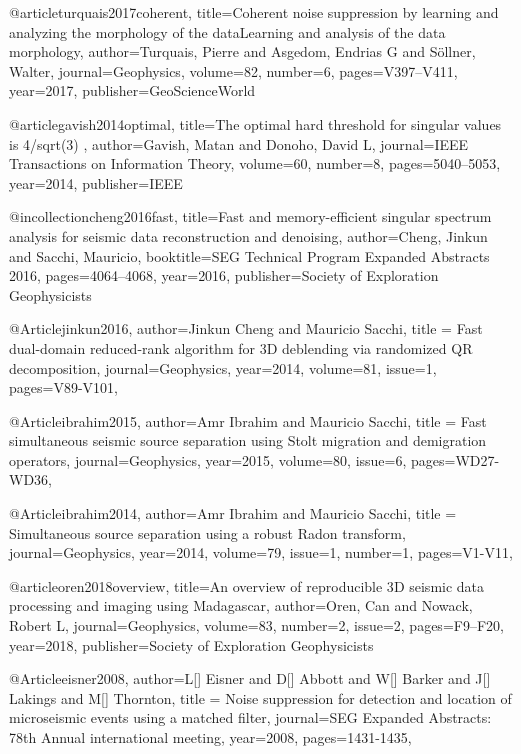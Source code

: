 @article{turquais2017coherent,
  title={Coherent noise suppression by learning and analyzing the morphology of the dataLearning and analysis of the data morphology},
  author={Turquais, Pierre and Asgedom, Endrias G and S{\"o}llner, Walter},
  journal={Geophysics},
  volume={82},
  number={6},
  pages={V397--V411},
  year={2017},
  publisher={GeoScienceWorld}
}

@article{gavish2014optimal,
  title={The optimal hard threshold for singular values is 4/sqrt(3) },
  author={Gavish, Matan and Donoho, David L},
  journal={IEEE Transactions on Information Theory},
  volume={60},
  number={8},
  pages={5040--5053},
  year={2014},
  publisher={IEEE}
}

@incollection{cheng2016fast,
  title={Fast and memory-efficient singular spectrum analysis for seismic data reconstruction and denoising},
  author={Cheng, Jinkun and Sacchi, Mauricio},
  booktitle={SEG Technical Program Expanded Abstracts 2016},
  pages={4064--4068},
  year={2016},
  publisher={Society of Exploration Geophysicists}
}

@Article{jinkun2016,
  author={Jinkun Cheng and Mauricio Sacchi},
  title = {Fast dual-domain reduced-rank algorithm for 3{D} deblending via randomized QR decomposition},
  journal={Geophysics},
  year=2014,
  volume=81,
  issue=1,
  pages={V89-V101},
}

@Article{ibrahim2015,
  author={Amr Ibrahim and Mauricio Sacchi},
  title = {Fast simultaneous seismic source separation using Stolt migration and demigration operators},
  journal={Geophysics},
  year=2015,
  volume=80,
  issue=6,
  pages={WD27-WD36},
}

@Article{ibrahim2014,
  author={Amr Ibrahim and Mauricio Sacchi},
  title = {Simultaneous source separation using a robust {R}adon transform},
  journal={Geophysics},
  year=2014,
  volume=79,
  issue=1,
  number=1,
  pages={V1-V11},
}

@article{oren2018overview,
  title={An overview of reproducible 3{D} seismic data processing and imaging using {M}adagascar},
  author={Oren, Can and Nowack, Robert L},
  journal={Geophysics},
  volume={83},
  number={2},
  issue=2,
  pages={F9--F20},
  year={2018},
  publisher={Society of Exploration Geophysicists}
}

@Article{eisner2008,
  author={L[] Eisner and D[] Abbott and W[] Barker and J[] Lakings and M[] Thornton},
  title = {Noise suppression for detection and location of microseismic events using a matched filter},
  journal={SEG Expanded Abstracts: 78th Annual international meeting},
  year=2008,
  pages={1431-1435},
}

